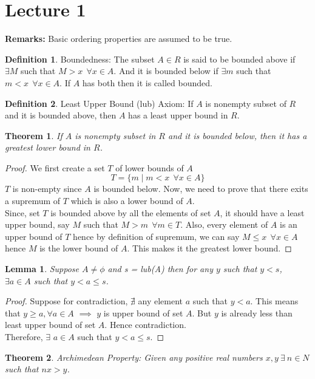 \documentclass[12pt]{report}
\newtheorem{thm}{Theorem}
\newtheorem{lem}{Lemma}
\theoremstyle{definition}
\newtheorem{defn}{Definition}
\begin{document}
\section*{Lecture 1}
\textbf{Remarks:} Basic ordering properties are assumed to be true.
\begin{defn}
    Boundedness: The subset $A \in R$ is said to be bounded above if $\exists M$ such that $M > x~~ \forall x \in A$. And it is bounded below if $\exists m$ such that $m < x~~ \forall x \in A$. If $A$ has both then it is called bounded.   
\end{defn}
\begin{defn}
    Least Upper Bound (lub) Axiom: If $A$ is nonempty subset of $R$ and it is bounded above, then $A$ has a least upper bound in $R$.
\end{defn}
\begin{thm}
    If $A$ is nonempty subset in $R$ and it is bounded below, then it has a greatest lower bound in $R$.
\end{thm}
\begin{proof}
    We first create a set $T$ of lower bounds of $A$ $$ T = \{m \mid m < x~~\forall x \in A\}$$ $T$ is non-empty since $A$ is bounded below. Now, we need to prove that there exits a supremum of $T$ which is also a lower bound of $A$.\\
    Since, set $T$ is bounded above by all the elements of set $A$, it should have a least upper bound, say $M$ such that $ M > m~~ \forall m \in T$. Also, every element of $A$ is an upper bound of $T$ hence by definition of supremum, we can say $M \leq x~~ \forall x \in A$ hence $M$ is the lower bound of $A$. This makes it the greatest lower bound.
\end{proof}
\begin{lem}
    Suppose $A \neq \phi$ and s = lub(A) then for any $y$ such that $y < s$, $\exists a \in A$ such that $ y < a \leq s$.
\end{lem}
\begin{proof}
    Suppose for contradiction, $\nexists$ any element $a$ such that $ y < a$. This means that $y \geq a, \forall a \in A$ $\implies$ $y$ is upper bound of set $A$. But $y$ is already less than least upper bound of set $A$. Hence contradiction. \\
    Therefore, $\exists$ $a \in A$ such that $ y < a \leq s$.   
\end{proof} 
\begin{thm}
    Archimedean Property: Given any positive real numbers $x,y~\exists~n \in N$ such that $ nx > y$.
\end{thm}
\end{document}

